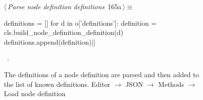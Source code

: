 \documentclass[%
    a4paper,    %
    justified,  %
    nobib,      %
    openany     %
]{tufte-book}
\makeatletter
\renewcommand{\label}[1]{\@tufte@label{##1}}%
\makeatother
\begin{document}
\begin{figure}[!htbp]
\begin{flushleft} \small
\begin{minipage}{\linewidth}\label{scrap130}\raggedright\small
{} $\langle\,${\itshape Parse node definition definitions}\nobreak\ {\footnotesize {165a}}$\,\rangle\equiv$
\vspace{-1ex}
\begin{pythoncode}
definitions = []
for d in o['definitions']:
    definition = cls.build_node_definition_definition(d)
    definitions.append(definition)|\NWsep|
\end{pythoncode}
\vspace{1.5ex}
\footnotesize
\begin{list}{}{\setlength{\itemsep}{-\parsep}\setlength{\itemindent}{-\leftmargin}}
\item \NWtxtMacroRefIn\ .

\item{}
\end{list}
\end{minipage}\vspace{4ex}
\end{flushleft}
\caption{The definitions of a node definition are parsed and then added to
the list of known definitions.
  \newline{}\newline{}Editor $\rightarrow$ JSON $\rightarrow$
  Methods $\rightarrow$ Load node definition}
\end{figure}
\end{document}
